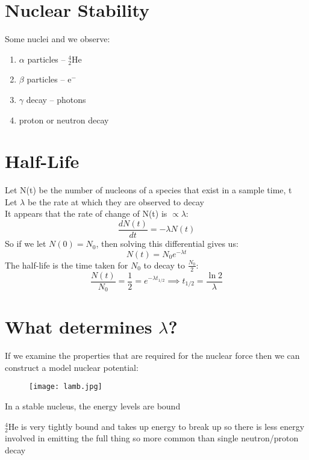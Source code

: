 \documentclass[a4paper, 11pt, fleqn, normalem]{report}
\begin{document}
\section{Nuclear Stability}
Some nuclei and we observe:
\begin{enumerate}
    \item $\alpha$ particles -- $_{2}^{4}$He
    \item $\beta$ particles -- e$^{-}$
    \item $\gamma$ decay -- photons
    \item proton or neutron decay
\end{enumerate}

\section{Half-Life}
Let N(t) be the number of nucleons of a species that exist in a sample time, t \\
Let $\lambda$ be the rate at which they are observed to decay \\
It appears that the rate of change of N(t) is $\propto \lambda$:
\begin{equation*}
    \frac{dN(t)}{dt} = -\lambda N(t)
\end{equation*}
So if we let $N(0) = N_{0}$, then solving this differential gives us:
\begin{equation*}
    N(t) = N_{0}e^{-\lambda t}
\end{equation*}
The half-life is the time taken for $N_{0}$ to decay to $\frac{N_{0}}{2}$:
\begin{equation*}
    \frac{N(t)}{N_{0}} = \frac{1}{2} = e^{-\lambda t_{1/2}} \implies t_{1/2} = \frac{\ln{2}}{\lambda}
\end{equation*}

\newpage
\section{What determines $\lambda$?}
If we examine the properties that are required for the nuclear force then we can construct a model nuclear potential:
\begin{figure}[H]
    \texttt{[image: lamb.jpg]}
\end{figure}
In a stable nucleus, the energy levels are bound

$_{2}^{4}$He is very tightly bound and takes up energy to break up so there is less energy involved in emitting the full thing so more common than single neutron/proton decay
\end{document}
